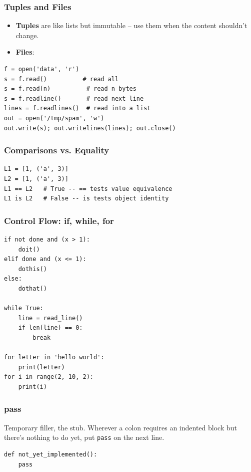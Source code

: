 \begin{frame}[fragile]\frametitle{Tuples and Files}
	\begin{itemize}
	\item \textbf{Tuples} are like lists but immutable -- use them when the content shouldn't change.
	\item \textbf{Files}:
	\end{itemize}
\begin{lstlisting}
f = open('data', 'r')
s = f.read()          # read all
s = f.read(n)          # read n bytes
s = f.readline()       # read next line
lines = f.readlines()  # read into a list
out = open('/tmp/spam', 'w')
out.write(s); out.writelines(lines); out.close()
\end{lstlisting}
\end{frame}

\begin{frame}[fragile]\frametitle{Comparisons vs. Equality}
\begin{lstlisting}
L1 = [1, ('a', 3)]
L2 = [1, ('a', 3)]
L1 == L2   # True -- == tests value equivalence
L1 is L2   # False -- is tests object identity
\end{lstlisting}
\end{frame}

\begin{frame}[fragile]\frametitle{Control Flow: if, while, for}
\begin{lstlisting}
if not done and (x > 1):
    doit()
elif done and (x <= 1):
    dothis()
else:
    dothat()

while True:
    line = read_line()
    if len(line) == 0:
        break

for letter in 'hello world':
    print(letter)
for i in range(2, 10, 2):
    print(i)
\end{lstlisting}
\end{frame}

\begin{frame}[fragile]\frametitle{pass}
Temporary filler, the stub. Wherever a colon requires an indented block but there's nothing to do yet, put \lstinline{pass} on the next line.
\begin{lstlisting}
def not_yet_implemented():
    pass
\end{lstlisting}
\end{frame}

